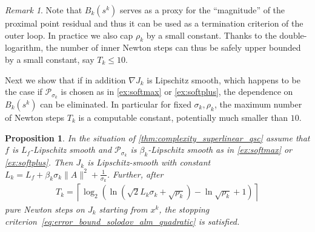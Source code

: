 \documentclass[11pt,onecolumn]{article}
\newtheorem{proposition}[proposition]{Proposition}
\theoremstyle{remark}
\newtheorem{remark}[remark]{Remark}
\begin{document}
\begin{remark}
Note that $B_k(s^k)$ serves as a proxy for the ``magnitude'' of the proximal point residual and thus it can be used as a termination criterion of the outer loop. In practice we also cap $\rho_k$ by a small constant. Thanks to the double-logarithm, the number of inner Newton steps can thus be safely upper bounded by a small constant, say $T_k \leq 10$.
\end{remark}
Next we show that if in addition $\nabla J_k$ is Lipschitz smooth, which happens to be the case if $\mathcal{P}_{\sigma_k}$ is chosen as in \cref{ex:softmax} or \cref{ex:softplus}, the dependence on $B_k(s^k)$ can be eliminated. In particular for fixed $\sigma_k,\rho_k$, the maximum number of Newton steps $T_k$ is a computable constant, potentially much smaller than $10$.
\begin{proposition}
In the situation of \cref{thm:complexity_superlinear_qsc} assume that $f$ is $L_f$-Lipschitz smooth and $\mathcal{P}_{\sigma_k}$ is $\beta_k$-Lipschitz smooth as in \cref{ex:softmax} or \cref{ex:softplus}. Then $J_k$ is Lipschitz-smooth with constant $L_k= L_f + \beta_k\sigma_k \|A\|^2 + \frac{1}{\sigma_k}$. Further, after
\begin{align}
    T_k = \left\lceil \log_2 (\ln (\sqrt{2}L_k \sigma_k + \sqrt{\rho_k} ) - \ln \sqrt{\rho_k} + 1) \right\rceil
\end{align}
pure Newton steps on $J_k$ starting from $x^k$, the stopping criterion~\cref{eq:error_bound_solodov_alm_quadratic} is satisfied.
\end{proposition} 
\end{document}
